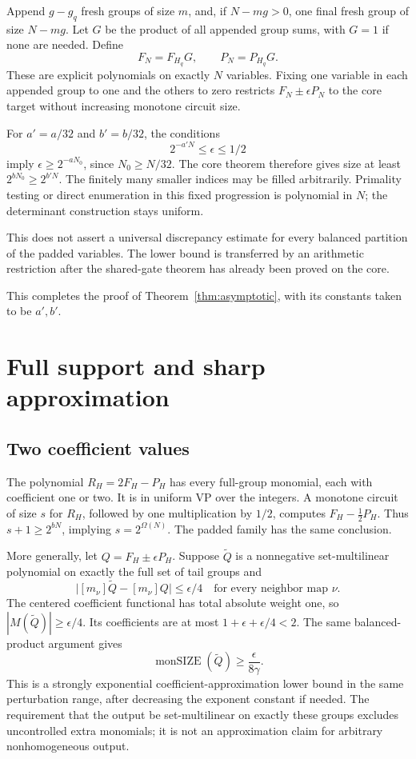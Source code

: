 \documentclass[11pt]{article}
\theoremstyle{definition}
\theoremstyle{remark}
\numberwithin{equation}{section}
\begin{document}
Append \(g-g_q\) fresh groups of size \(m\), and, if \(N-mg>0\),
one final fresh group of size \(N-mg\). Let \(G\) be the product
of all appended group sums, with \(G=1\) if none are needed.
Define
\[
             F_N=F_{H_q}G,\qquad P_N=P_{H_q}G.
\]
These are explicit polynomials on exactly \(N\) variables.
Fixing one variable in each appended group to one and the
others to zero restricts \(F_N\pm\epsilon P_N\) to the core
target without increasing monotone circuit size.

For \(a'=a/32\) and \(b'=b/32\), the conditions
\[
                       2^{-a'N}\le\epsilon\le1/2
\]
imply \(\epsilon\ge2^{-aN_0}\), since \(N_0\ge N/32\).
The core theorem therefore gives size at least
\(2^{bN_0}\ge2^{b'N}\).
The finitely many smaller indices may be filled arbitrarily.
Primality testing or direct enumeration in this fixed progression
is polynomial in \(N\); the determinant construction stays uniform.

This does not assert a universal discrepancy estimate for every
balanced partition of the padded variables. The lower bound is
transferred by an arithmetic restriction after the shared-gate
theorem has already been proved on the core.

This completes the proof of Theorem~\ref{thm:asymptotic},
with its constants taken to be \(a',b'\).


\section{Full support and sharp approximation}\label{sec:approx}

\subsection{Two coefficient values}\label{sub:twolevels}
The polynomial \(R_H=2F_H-P_H\) has every full-group monomial,
each with coefficient one or two. It is in uniform VP over the
integers. A monotone circuit of size \(s\) for \(R_H\), followed
by one multiplication by \(1/2\), computes
\(F_H-\tfrac12P_H\). Thus \(s+1\ge2^{bN}\), implying
\(s=2^{\Omega(N)}\). The padded family has the same conclusion.

More generally, let \(Q=F_H\pm\epsilon P_H\). Suppose
\(\widetilde Q\) is a nonnegative set-multilinear polynomial
on exactly the full set of tail groups and
\[
 \big|[m_\nu]\widetilde Q-[m_\nu]Q\big|\le\epsilon/4
                         \quad\text{for every neighbor map }\nu.
\]
The centered coefficient functional has total absolute weight
one, so \(|M(\widetilde Q)|\ge\epsilon/4\).
Its coefficients are at most \(1+\epsilon+\epsilon/4<2\).
The same balanced-product argument gives
\[
            \operatorname{monSIZE}(\widetilde Q)
                      \ge\frac{\epsilon}{8\gamma}.
\]
This is a strongly exponential coefficient-approximation lower
bound in the same perturbation range, after decreasing the
exponent constant if needed. The requirement that the output
be set-multilinear on exactly these groups excludes uncontrolled
extra monomials; it is not an approximation claim for arbitrary
nonhomogeneous output.
\end{document}
